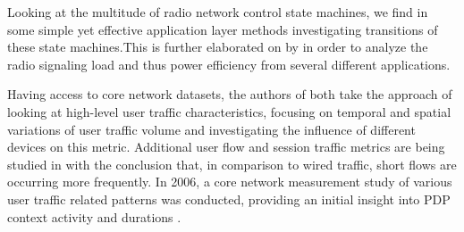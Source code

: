 Looking at the multitude of radio network control state machines, we find in \cite{5360763} some simple yet effective application layer methods investigating transitions of these state machines.This is further elaborated on by \cite{schwartz2013angrybirds} in order to analyze the radio signaling load and thus power efficiency from several different applications.

Having access to core network datasets, the authors of \cite{shafiq2011characterizing, paul2011understanding} both take the approach of looking at high-level user traffic characteristics, focusing on temporal and spatial variations of user traffic volume and investigating the influence of different devices on this metric.
Additional user flow and session traffic metrics are being studied in \cite{Zhang:2012:UCC:2377677.2377764} with the conclusion that, in comparison to wired traffic, short flows are occurring more frequently.
In 2006, a core network measurement study of various user traffic related patterns was conducted, providing an initial insight into \gls{PDP} context activity and durations \cite{svoboda2006composition}.


